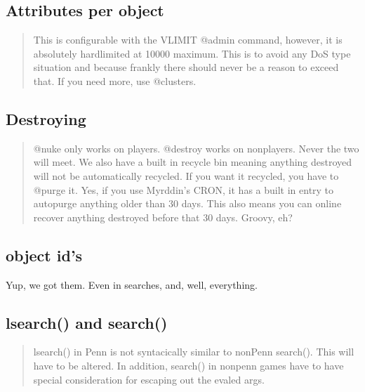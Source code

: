 \documentclass[letterpaper,10pt,english]{sphinxmanual}
\begin{document}
\subsection{Attributes per object}
\label{\detokenize{differences:attributes-per-object}}\begin{quote}

\sphinxAtStartPar
This is configurable with the VLIMIT @admin
command, however, it is absolutely hard\sphinxhyphen{}limited at 10000 maximum.
This is to avoid any DoS type situation and because frankly there
should never be a reason to exceed that.  If you need more, use
@clusters.
\end{quote}


\subsection{Destroying}
\label{\detokenize{differences:destroying}}\begin{quote}

\sphinxAtStartPar
@nuke only works on players.  @destroy works on non\sphinxhyphen{}players.
Never the two will meet.  We also have a built in recycle bin meaning
anything destroyed will not be automatically recycled.  If you want it
recycled, you have to @purge it.  Yes, if you use  Myrddin’s CRON, it
has a built in entry to auto\sphinxhyphen{}purge anything older than 30 days.  This
also means you can on\sphinxhyphen{}line recover anything destroyed before that 30
days.  Groovy, eh?
\end{quote}


\subsection{object id’s}
\label{\detokenize{differences:object-id-s}}
\sphinxAtStartPar
Yup, we got them.  Even in searches, and, well, everything.


\subsection{lsearch() and search()}
\label{\detokenize{differences:lsearch-and-search}}\begin{quote}

\sphinxAtStartPar
lsearch() in Penn is not syntacically similar to non\sphinxhyphen{}Penn search().
This will have to be altered.  In addition, search() in non\sphinxhyphen{}penn games
have to have special consideration for escaping out the evaled args.
\end{quote}
\end{document}
